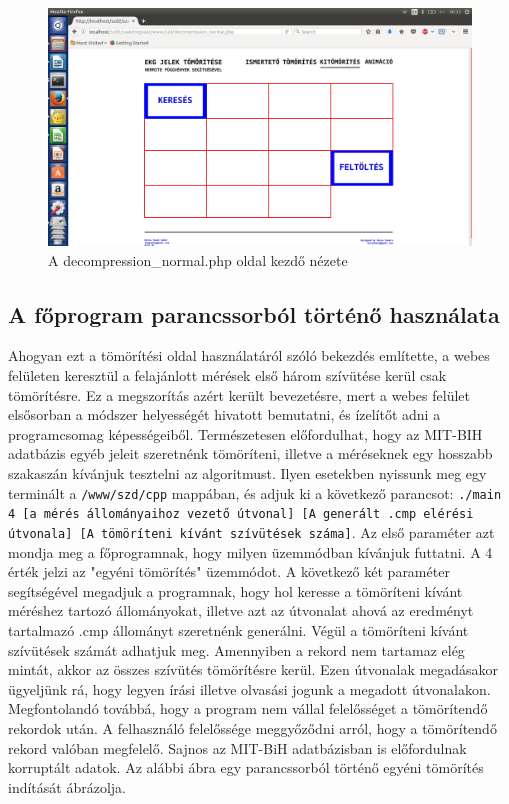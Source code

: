 \documentclass[oneside,titlepage,12pt,a4paper]{report}
\begin{document}
\begin{figure}[H]
\begin{center}
  \includegraphics[width=150mm]{./Abrak/WWW/kitom_alap.png}
  \caption{A decompression\_normal.php oldal kezdő nézete}
\end{center}
\end{figure}

\subsection*{A főprogram parancssorból történő használata} \label{sec:hosszu}

Ahogyan ezt a tömörítési oldal használatáról szóló bekezdés említette, a webes felületen keresztül a felajánlott mérések első három szívütése kerül csak tömörítésre. Ez a megszorítás azért került bevezetésre, mert a webes felület elsősorban a módszer helyességét hivatott bemutatni, és ízelítőt adni a programcsomag képességeiből. Természetesen előfordulhat, hogy az MIT-BIH adatbázis egyéb jeleit szeretnénk tömöríteni, illetve a méréseknek egy hosszabb szakaszán kívánjuk tesztelni az algoritmust. Ilyen esetekben nyissunk meg egy terminált a \texttt{/www/szd/cpp}  mappában, és adjuk ki a következő parancsot: \texttt{./main 4 [a mérés állományaihoz vezető útvonal] [A generált .cmp elérési útvonala] [A tömöríteni kívánt szívütések száma]}. Az első paraméter azt mondja meg a főprogramnak, hogy milyen üzemmódban kívánjuk futtatni. A 4 érték jelzi az "egyéni tömörítés" üzemmódot. A következő két paraméter segítségével megadjuk a programnak, hogy hol keresse a tömöríteni kívánt méréshez  tartozó állományokat, illetve azt az útvonalat ahová az eredményt tartalmazó .cmp állományt szeretnénk generálni. Végül a tömöríteni kívánt szívütések számát adhatjuk meg. Amennyiben a rekord nem tartamaz elég mintát, akkor az összes szívütés tömörítésre kerül. Ezen útvonalak megadásakor ügyeljünk rá, hogy legyen írási illetve olvasási jogunk a megadott útvonalakon. Megfontolandó továbbá, hogy a program nem vállal felelősséget a tömörítendő rekordok után. A felhasználó felelőssége meggyőződni arról, hogy a tömörítendő rekord valóban megfelelő. Sajnos az MIT-BiH adatbázisban is előfordulnak korruptált adatok. Az alábbi ábra egy parancssorból történő egyéni tömörítés indítását ábrázolja.
\end{document}
